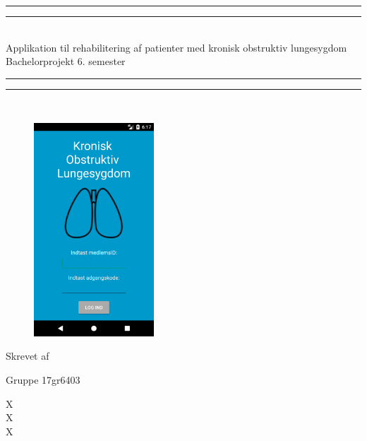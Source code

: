\begin{center}
\vspace*{\baselineskip}
\rule{\textwidth}{1.6pt}\vspace*{-\baselineskip}\vspace*{2pt} %
\rule{\textwidth}{0.4pt}\\[\baselineskip] %

{\huge Applikation til rehabilitering af  patienter med kronisk obstruktiv lungesygdom\\[0.4\baselineskip] \LARGE Bachelorprojekt 6. semester}\\[0.2\baselineskip] %

\rule{\textwidth}{0.4pt}\vspace*{-\baselineskip}\vspace{3.2pt} %
\rule{\textwidth}{1.6pt}\\[\baselineskip] %
\vspace*{3\baselineskip}




\begin{figure} [H]
\centering
\includegraphics[width=0.4\textwidth]{figures/test/forside}
\label{fig:aktivitetsdiagram}
\end{figure}
Skrevet af \\
{\Large Gruppe 17gr6403\par}
\end{center} %
{\color{white}X \\ X \\ X \\}

